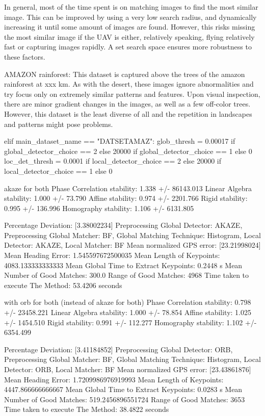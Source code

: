 In general, most of the time spent is on matching images to find the most similar image. This can be improved by using a very low search radius, and dynamically increasing it until some amount of images are found. However, this risks missing the most similar image if the UAV is either, relatively speaking, flying relatively fast or capturing images rapidly. A set search space ensures more robustness to these factors.





AMAZON rainforest:
This dataset is captured above the trees of the amazon rainforest at xxx km. As with the desert, these images ignore abnormalities and try focus only on extremely similar patterns and features. Upon visual inspection, there are minor gradient changes in the images, as well as a few off-color trees. However, this dataset is the least diverse of all and the repetition in landscapes and patterns might pose problems. 


elif main_dataset_name == "DATSETAMAZ":
glob_thresh = 0.00017 if global_detector_choice == 2 else 20000 if global_detector_choice == 1 else 0
loc_det_thresh = 0.0001 if local_detector_choice == 2 else 20000 if local_detector_choice == 1 else 0

    akaze for both
Phase Correlation stability: 1.338 +/- 86143.013
Linear Algebra stability: 1.000 +/- 73.790
Affine stability: 0.974 +/- 2201.766
Rigid stability: 0.995 +/- 136.996
Homography stability: 1.106 +/- 6131.805

Percentage Deviation: [3.38002234] %
Preprocessing Global Detector: AKAZE, Preprocessing Global Matcher: BF, Global Matching Technique: Histogram, Local Detector: AKAZE, Local Matcher: BF
Mean normalized GPS error: [23.21998024]
 Mean Heading Error: 1.545597672500035
Mean Length of Keypoints: 4083.133333333333
Mean Global Time to Extract Keypoints: 0.2448 s
Mean Number of Good Matches: 300.0
Range of Good Matches: 4968
Time taken to execute The Method: 53.4206 seconds


with orb for both (instead of akaze for both)
Phase Correlation stability: 0.798 +/- 23458.221
Linear Algebra stability: 1.000 +/- 78.854
Affine stability: 1.025 +/- 1454.510
Rigid stability: 0.991 +/- 112.277
Homography stability: 1.102 +/- 6354.499

Percentage Deviation: [3.41184852] %
Preprocessing Global Detector: ORB, Preprocessing Global Matcher: BF, Global Matching Technique: Histogram, Local Detector: ORB, Local Matcher: BF
Mean normalized GPS error: [23.43861876]
 Mean Heading Error: 1.7209986976919993
Mean Length of Keypoints: 4447.866666666667
Mean Global Time to Extract Keypoints: 0.0283 s
Mean Number of Good Matches: 519.2456896551724
Range of Good Matches: 3653
Time taken to execute The Method: 38.4822 seconds



